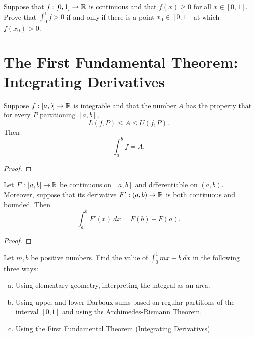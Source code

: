 \documentclass[letterpaper, twoside, 12pt]{book}
\begin{document}
\begin{exercise}[6]
  Suppose that \(f:[0,1]\to\mathbb R\) is continuous and that \(f(x)\geq 0\) for
  all \(x\in[0,1]\). Prove that \(\int_0^1 f>0\) if and only if there is a
  point \(x_0\in[0,1]\) at which \(f(x_0)>0\).
\end{exercise}
\begin{solution}

\end{solution}




\section{The First Fundamental Theorem: Integrating Derivatives}


\begin{lemma}[6.21]
  Suppose \(f:[a,b]\to\mathbb R\) is integrable and that the number \(A\) has
  the property that for every \(P\) partitioning \([a,b]\),
  \[
    L(f,P) \leq A \leq U(f,P)
  .\]
  Then
  \[
    \int_a^b f = A
  .\]
\end{lemma}
\begin{proof}

\end{proof}


\begin{theorem}
  Let \(F:[a,b]\to\mathbb R\) be continuous on \([a,b]\) and differentiable on
  \((a,b)\). Moreover, suppose that its derivative
  \(F':(a,b)\to\mathbb R\) is both continuous and bounded. Then
  \[
    \int_a^b F'(x)~dx
      =
    F(b)-F(a)
  .\]
\end{theorem}
\begin{proof}

\end{proof}


\begin{exercise}[1]
  Let \(m,b\) be positive numbers. Find the value of \(\int_0^1 mx+b ~dx\)
  in the following three ways:
  \begin{enumerate}[(a)]
    \item Using elementary geometry, interpreting the integral as an area.
    \item Using upper and lower Darboux sums based on regular partitions of
      the interval \([0,1]\) and using the Archimedes-Riemann Theorem.
    \item Using the First Fundamental Theorem (Integrating Derivatives).
  \end{enumerate}
\end{exercise}
\begin{solution}

\end{solution}
\end{document}
